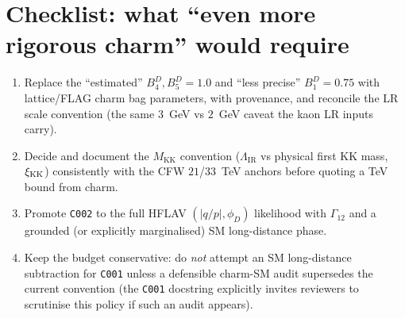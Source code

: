 \documentclass[11pt]{article}
\newcommand{\MKK}{M_{\mathrm{KK}}}
\newcommand{\LIR}{\Lambda_{\mathrm{IR}}}
\newcommand{\code}[1]{\texttt{#1}}
\theoremstyle{definition}
\begin{document}
\section{Checklist: what ``even more rigorous charm'' would require}
\label{sec:checklist}

\begin{enumerate}[leftmargin=1.8em]
\item Replace the ``estimated'' $B_4^D,B_5^D=1.0$ and ``less precise''
$B_1^D=0.75$ with lattice/FLAG charm bag parameters, with provenance, and
reconcile the LR scale convention (the same $3$~GeV vs $2$~GeV caveat the kaon
LR inputs carry).
\item Decide and document the $\MKK$ convention ($\LIR$ vs physical first KK
mass, $\xi_{\rm KK}$) consistently with the CFW $21$/$33$~TeV anchors before
quoting a TeV bound from charm.
\item Promote \code{C002} to the full HFLAV $(|q/p|,\phi_D)$ likelihood with
$\Gamma_{12}$ and a grounded (or explicitly marginalised) SM long-distance phase.
\item Keep the budget conservative: do \emph{not} attempt an SM long-distance
subtraction for \code{C001} unless a defensible charm-SM audit supersedes the
current convention (the \code{C001} docstring explicitly invites reviewers to
scrutinise this policy if such an audit appears).
\end{enumerate}
\end{document}
